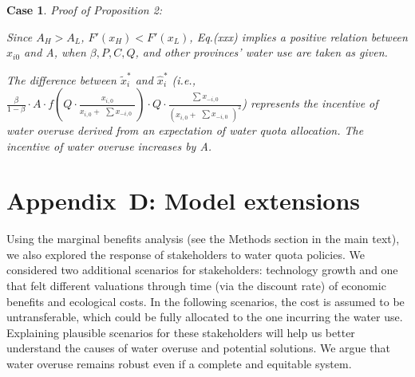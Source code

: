 \documentclass[default, sn-standardnature]{sn-jnl} %
\newtheorem{case_appendix}{Case}
\begin{document}
\begin{case_appendix}
Proof of Proposition 2:

Since $A_H>A_L$, $F'(x_H)<F'(x_L)$,
Eq.(xxx) %
implies a positive relation between $x_{i0}$ and A, when $\beta, P, C, Q$, and other provinces' water use are taken as given.

The difference between $\widetilde x_i^*$ and $\hat x_i^*$ (i.e., $\frac{\beta}{1-\beta} \cdot A \cdot f(Q \cdot \frac{x_{i,0}}{x_{i,0} + \begin{matrix} \sum x_{-i,0} \end{matrix}}) \cdot Q \cdot \frac{\begin{matrix} \sum x_{-i,0} \end{matrix}}{(x_{i,0} + \begin{matrix} \sum x_{-i,0} \end{matrix})^2}$) represents the incentive of water overuse derived from an expectation of water quota allocation. The incentive of water overuse increases by A.
\end{case_appendix}


\section{Appendix~D: Model extensions}\label{secS5}
\renewcommand{\thefigure}{D\arabic{figure}}
\renewcommand{\thetable}{D\arabic{table}}
\setcounter{figure}{0}
\setcounter{table}{0}
Using the marginal benefits analysis (see the Methods section in the main text), we also explored the response of stakeholders to water quota policies. We considered two additional scenarios for stakeholders: technology growth and one that felt different valuations through time (via the discount rate) of economic benefits and ecological costs. In the following scenarios, the cost is assumed to be untransferable, which could be fully allocated to the one incurring the water use. Explaining plausible scenarios for these stakeholders will help us better understand the causes of water overuse and potential solutions. We argue that water overuse remains robust even if a complete and equitable system.
\end{document}
